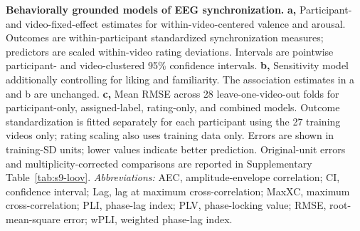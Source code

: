 \caption{\textbf{Behaviorally grounded models of EEG synchronization.} \textbf{a,} Participant- and video-fixed-effect estimates for within-video-centered valence and arousal. Outcomes are within-participant standardized synchronization measures; predictors are scaled within-video rating deviations. Intervals are pointwise participant- and video-clustered 95\% confidence intervals. \textbf{b,} Sensitivity model additionally controlling for liking and familiarity. The association estimates in a and b are unchanged. \textbf{c,} Mean RMSE across 28 leave-one-video-out folds for participant-only, assigned-label, rating-only, and combined models. Outcome standardization is fitted separately for each participant using the 27 training videos only; rating scaling also uses training data only. Errors are shown in training-SD units; lower values indicate better prediction. Original-unit errors and multiplicity-corrected comparisons are reported in Supplementary Table~\ref{tab:s9-loov}. \textit{Abbreviations:} AEC, amplitude-envelope correlation; CI, confidence interval; Lag, lag at maximum cross-correlation; MaxXC, maximum cross-correlation; PLI, phase-lag index; PLV, phase-locking value; RMSE, root-mean-square error; wPLI, weighted phase-lag index.}
